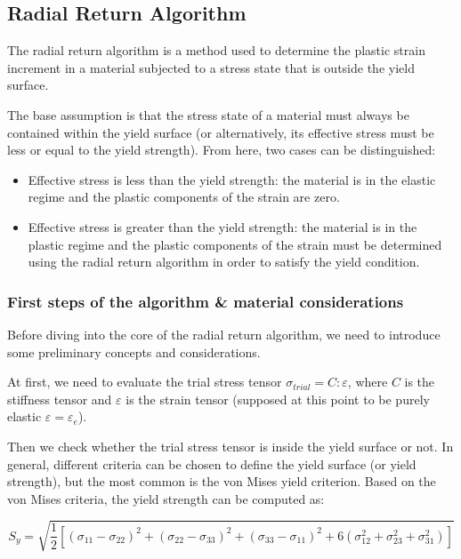 \subsection{Radial Return Algorithm}
\label{subsec:radial_return_algorithm}

The radial return algorithm is a method used to determine the plastic strain increment in a material subjected to a stress state that is outside the yield surface.

The base assumption is that the stress state of a material must always be contained within the yield surface (or alternatively, its effective stress must be less or equal to the yield strength).
From here, two cases can be distinguished:

\begin{itemize}
    \item Effective stress is less than the yield strength: the material is in the elastic regime and the plastic components of the strain are zero.
    \item Effective stress is greater than the yield strength: the material is in the plastic regime and the plastic components of the strain must be determined using the radial return algorithm in order to satisfy the yield condition.
\end{itemize}


\subsubsection{First steps of the algorithm \& material considerations}

Before diving into the core of the radial return algorithm, we need to introduce some preliminary concepts and considerations.

At first, we need to evaluate the trial stress tensor $\sigma_{trial} = C : \varepsilon$, where $C$ is the stiffness tensor and $\varepsilon$ is the strain tensor (supposed at this point to be purely elastic $\varepsilon = \varepsilon_e$).

Then we check whether the trial stress tensor is inside the yield surface or not.
In general, different criteria can be chosen to define the yield surface (or yield strength), but the most common is the von Mises yield criterion.
Based on the von Mises criteria, the yield strength can be computed as:

\begin{equation}
    S_y = \sqrt{\frac{1}{2} [(\sigma_{11} - \sigma_{22})^2 + (\sigma_{22} - \sigma_{33})^2 + (\sigma_{33} - \sigma_{11})^2 + 6 (\sigma_{12}^2 + \sigma_{23}^2 + \sigma_{31}^2)]}
\end{equation}

